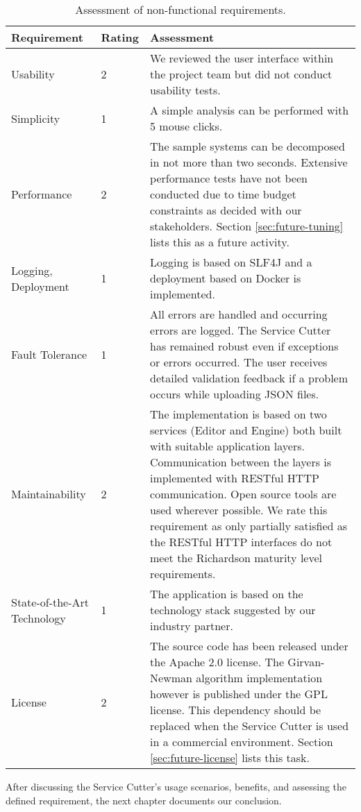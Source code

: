 \begin{table}[H]
	\centering
	\caption{Assessment of non-functional requirements.}
	\label{tab:conclusionNonFunctional}
	\begin{tabular}{|p{100pt}|l|p{250pt}|}
	\hline \textbf{Requirement} & \textbf{Rating} & \textbf{Assessment} \\ 
	\hline Usability & 2 & We reviewed the user interface within the project team but did not conduct usability tests. \\
	\hline Simplicity & 1 & A simple analysis can be performed with 5 mouse clicks. \\
	\hline Performance & 2 & The sample systems can be decomposed in not more than two seconds. Extensive performance tests have not been conducted due to time budget constraints as decided with our stakeholders. Section \ref{sec:future-tuning} lists this as a future activity. \\
	\hline Logging, \newline Deployment & 1 & Logging is based on SLF4J and a deployment based on Docker is implemented. \\
	\hline Fault Tolerance & 1 & All errors are handled and occurring errors are logged. The Service Cutter has remained robust even if exceptions or errors occurred. The user receives detailed validation feedback if a problem occurs while uploading JSON files. \\
	\hline Maintainability & 2 & The implementation is based on two services (Editor and Engine) both built with suitable application layers. Communication between the layers is implemented with RESTful HTTP communication. Open source tools are used wherever possible. We rate this requirement as only partially satisfied as the RESTful HTTP interfaces do not meet the Richardson maturity level requirements.  \\
	\hline State-of-the-Art Technology & 1 & The application is based on the technology stack suggested by our industry partner. \\
	\hline License & 2 & The source code has been released under the Apache 2.0 license. The Girvan-Newman algorithm implementation however is published under the GPL license. This dependency should be replaced when the Service Cutter is used in a commercial environment. Section \ref{sec:future-license} lists this task. \\
	\hline 
	\end{tabular} 
\end{table}

After discussing the Service Cutter's usage scenarios, benefits, and assessing the defined requirement, the next chapter documents our conclusion.

